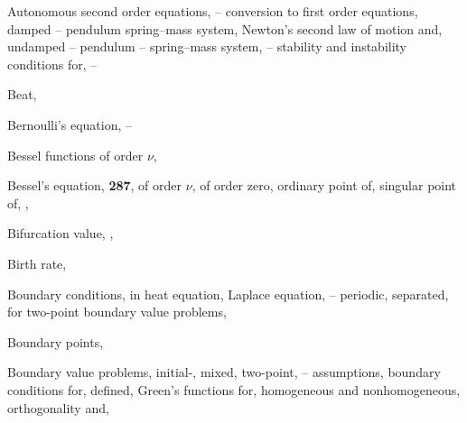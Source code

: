 \begin{theindex}
  \item Autonomous second order equations, \pageref{eq:4.4.1}--\pageref{example:4.5.7}
    \subitem conversion to first order equations, \pageref{eq:4.4.1}
    \subitem damped \pageref{eq:4.4.26}--\pageref{exer:4.4.24}
      \subsubitem pendulum \pageref{example:4.4.5}
      \subsubitem spring--mass system, \pageref{eq:4.4.26}
    \subitem Newton's second law of motion and, \pageref{eq:4.4.6}
    \subitem undamped \pageref{eq:4.4.7}--\pageref{eq:4.4.24}
      \subsubitem pendulum \pageref{eq:4.4.26}--\pageref{eq:4.4.17}
      \subsubitem spring--mass system, \pageref{eq:4.4.8}--\pageref{eq:4.4.26}
    \subitem stability and instability conditions for, \pageref{eq:4.4.18}--\pageref{exer:4.4.24} 

  \item Beat, \pageref{eq:6.1.21}

  \item Bernoulli's equation, \pageref{eq:2.4.2}--\pageref{eq:2.4.4}

  \item Bessel functions of order $\nu$, \pageref{exer:7.5.53}

  \item Bessel's equation, \pageref{exer:5.1.8} {\bf 287}, \pageref{eq:7.5.2}
    \subitem of order $\nu$, \pageref{exer:7.5.53}
    \subitem of order zero, \pageref{exer:7.6.56}
    \subitem ordinary point of, \pageref{eq:7.2.2}
    \subitem singular point of, \pageref{eq:7.2.2}, \pageref{eq:7.4.4}

  \item Bifurcation value, \pageref{exer:2.2.31}, \pageref{exer:4.4.13}

  \item Birth rate, \pageref{eq:1.1.2}

  \item Boundary conditions, \pageref{thmtype:11.1.1}
    \subitem in heat equation, \pageref{eq:12.1.1}
    \subitem Laplace equation, \pageref{exer:12.2.68}--\pageref{example:12.3.1}
    \subitem periodic, \pageref{thmtype:11.1.1}
    \subitem separated, \pageref{eq:13.1.5}
    \subitem for two-point boundary value problems, \pageref{eq:13.1.5}

  \item Boundary points, \pageref{eq:13.1.5}

  \item Boundary value problems, \pageref{eq:12.1.1}
    \subitem initial-, \pageref{eq:12.1.1}
    \subitem mixed, \pageref{eq:12.3.2}
    \subitem two-point, \pageref{eq:13.1.1}--\pageref{exer:13.1.32}
      \subsubitem assumptions, \pageref{eq:13.1.1}
      \subsubitem boundary conditions for, \pageref{eq:13.1.1}
      \subsubitem defined, \pageref{eq:13.1.1}
      \subsubitem Green's functions for, \pageref{eq:13.1.19}
      \subsubitem homogeneous and nonhomogeneous, \pageref{eq:13.1.6}
      \subsubitem orthogonality and, \pageref{thmtype:11.1.6}


\end{theindex}
